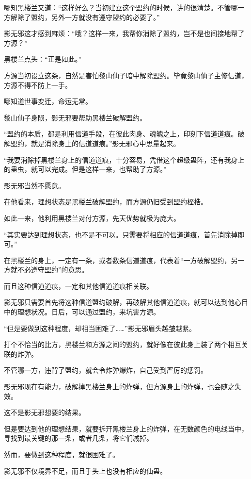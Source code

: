 \begin{this_body}
哪知黑楼兰又道：“这样好么？当初建立这个盟约的时候，讲的很清楚。不管哪一方解除了盟约，另外一方就没有遵守盟约的必要了。”

影无邪这才感到麻烦：“哦？这样一来，我帮你消除了盟约，岂不是也间接地帮了方源？”

黑楼兰点头：“正是如此。”

方源当初设立这条，自然是害怕黎山仙子暗中解除盟约。毕竟黎山仙子主修信道，方源不得不防上一手。

哪知道世事变迁，命运无常。

黎山仙子身陨，影无邪要帮助黑楼兰破解盟约。

“盟约的本质，都是利用信道手段，在彼此肉身、魂魄之上，印刻下信道道痕。破解盟约，就是消除身上的信道道痕。”影无邪心中思量起来。

“我要消除掉黑楼兰身上的信道道痕，十分容易，凭借这个超级蛊阵，还有我身上的蛊虫，就可以完成。但是这样一来，也帮助了方源。”

影无邪当然不愿意。

在他看来，理想状态是黑楼兰破解盟约，而方源仍旧受到盟约桎梏。

如此一来，他利用黑楼兰对付方源，先天优势就极为庞大。

“其实要达到理想状态，也不是不可以。只需要将相应的信道道痕，首先消除掉即可。”

在黑楼兰的身上，一定有一条，或者数条信道道痕，代表着“一方破解盟约，另一方就不必遵守盟约”的意思。

而且这种信道道痕，一定和其他信道道痕相关联。

影无邪只需要首先将这种信道盟约破解，再破解其他信道道痕，就可以达到他心目中的理想状况。日后，可以通过盟约，来坑害方源。

“但是要做到这种程度，却相当困难了……”影无邪眉头越皱越紧。

打个不恰当的比方，黑楼兰和方源之间的盟约，就好像在彼此身上装了两个相互关联的炸弹。

不管哪一方，违背了盟约，就会令炸弹爆炸，自己受到严厉的惩罚。

影无邪现在有能力，破解掉黑楼兰身上的炸弹，但方源身上的炸弹，也会随之失效。

这不是影无邪想要的结果。

但是要达到他的理想结果，就要拆开黑楼兰身上的炸弹，在无数颜色的电线当中，寻找到最关键的那一条，或者几条，将它们减掉。

然而，要做到这种程度，就很困难了。

影无邪不仅境界不足，而且手头上也没有相应的仙蛊。


\end{this_body}
